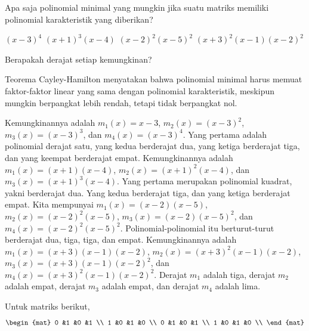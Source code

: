\begin{exercises}
  \recommended \item 
    Apa saja polinomial minimal yang mungkin jika suatu matriks memiliki
    polinomial karakteristik yang diberikan?
    \begin{exparts*}
      \partsitem $(x-3)^4$
      \partsitem $(x+1)^3(x-4)$
      \partsitem $(x-2)^2(x-5)^2$
      \partsitem  \( (x+3)^2(x-1)(x-2)^2 \)
    \end{exparts*}
    Berapakah derajat setiap kemungkinan?
    \begin{answer} 
      Teorema Cayley-Hamilton  menyatakan bahwa
      polinomial minimal harus memuat faktor-faktor linear yang sama
      dengan polinomial karakteristik, meskipun mungkin berpangkat lebih rendah,
      tetapi tidak berpangkat nol.
      \begin{exparts}
        \partsitem Kemungkinannya adalah
          $m_1(x)=x-3$, $m_2(x)=(x-3)^2$, $m_3(x)=(x-3)^3$,
          dan $m_4(x)=(x-3)^4$.
          Yang pertama adalah polinomial derajat satu, yang kedua berderajat dua,
          yang ketiga berderajat tiga, dan yang keempat berderajat empat.
        \partsitem Kemungkinannya adalah $m_1(x)=(x+1)(x-4)$,
          $m_2(x)=(x+1)^2(x-4)$, dan $m_3(x)=(x+1)^3(x-4)$.
          Yang pertama merupakan polinomial kuadrat, yakni berderajat dua.
          Yang kedua berderajat tiga, dan yang ketiga berderajat empat.
        \partsitem Kita mempunyai $m_1(x)=(x-2)(x-5)$, $m_2(x)=(x-2)^2(x-5)$,
          $m_3(x)=(x-2)(x-5)^2$, dan $m_4(x)=(x-2)^2(x-5)^2$.
          Polinomial-polinomial itu berturut-turut berderajat dua, tiga, tiga, dan empat.
        \partsitem Kemungkinannya adalah \( m_1(x)=(x+3)(x-1)(x-2) \),
          \( m_2(x)=(x+3)^2(x-1)(x-2) \),
          \( m_3(x)=(x+3)(x-1)(x-2)^2 \),
          dan \( m_4(x)=(x+3)^2(x-1)(x-2)^2 \).
          Derajat $m_1$ adalah tiga, derajat $m_2$ adalah empat,
          derajat $m_3$ adalah empat, dan derajat $m_4$ adalah lima.
      \end{exparts}
    \end{answer}
  \item Untuk matriks berikut,
    \begin{equation*}
      \begin{mat}
        0 &1 &0 &1 \\
        1 &0 &1 &0 \\
        0 &1 &0 &1 \\
        1 &0 &1 &0 \\

\end{mat}
\end{equation*}
\end{exercises}
